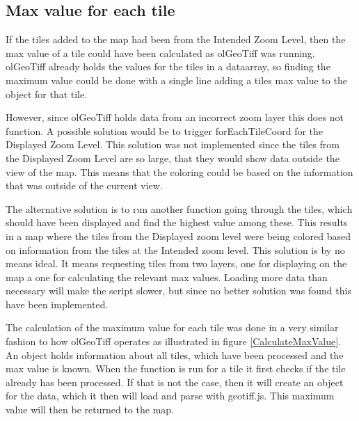 \subsection{Max value for each tile}
If the tiles added to the map had been from the Intended Zoom Level, then the max value of a tile could have been calculated as olGeoTiff was running. olGeoTiff already holds the values for the tiles in a dataarray, so finding the maximum value could be done with a single line adding a tiles max value to the object for that tile. %


However, since olGeoTiff holds data from an incorrect zoom layer this does not function. A possible solution would be to trigger forEachTileCoord for the Displayed Zoom Level. This solution was not implemented since the tiles from the Displayed Zoom Level are so large, that they would show data outside the view of the map. This means that the coloring could be based on the information that was outside of the current view.

The alternative solution is to run another function going through the tiles, which should have been displayed and find the highest value among these. This results in a map where the tiles from the Displayed zoom level were being colored based on information from the tiles at the Intended zoom level. This solution is by no means ideal. It means requesting tiles from two layers, one for displaying on the map a one for calculating the relevant max values. Loading more data than necessary will make the script slower, but since no better solution was found this have been implemented.

The calculation of the maximum value for each tile was done in a very similar fashion to how olGeoTiff operates as illustrated in figure \ref{CalculateMaxValue}. An object holds information about all tiles, which have been processed and the max value is known. When the function is run for a tile it first checks if the tile already has been processed. If that is not the case, then it will create an object for the data, which it then will load and parse with geotiff.js. %
This maximum value will then be returned to the map. 

